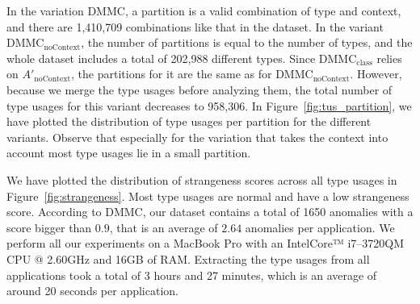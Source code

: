 In the variation $\text{DMMC}$, a partition is a valid combination of type and context, and there are 1,410,709 combinations like that in the dataset.
In the variant $\text{DMMC}_{\text{noContext}}$, the number of partitions is equal to the number of types, and the whole dataset includes a total of 202,988 different types.
Since $\text{DMMC}_{\text{class}}$ relies on $A'_\text{noContext}$, the partitions for it are the same as for $\text{DMMC}_{\text{noContext}}$.
However, because we merge the type usages before analyzing them, the total number of type usages for this variant decreases to 958,306.
In Figure~\ref{fig:tus_partition}, we have plotted the distribution of type usages per partition for the different variants.
Observe that especially for the variation that takes the context into account most type usages lie in a small partition.

We have plotted the distribution of strangeness scores across all type usages in Figure~\ref{fig:strangeness}.
Most type usages are normal and have a low strangeness score.
According to $\text{DMMC}$, our dataset contains a total of 1650 anomalies with a score bigger than $0.9$, that is an average of $2.64$ anomalies per application.
We perform all our experiments on a MacBook Pro with an Intel\textregistered Core™ i7--3720QM CPU @ 2.60GHz and 16GB of RAM\@.
Extracting the type usages from all applications took a total of 3 hours and 27 minutes, which is an average of around 20 seconds per application.

